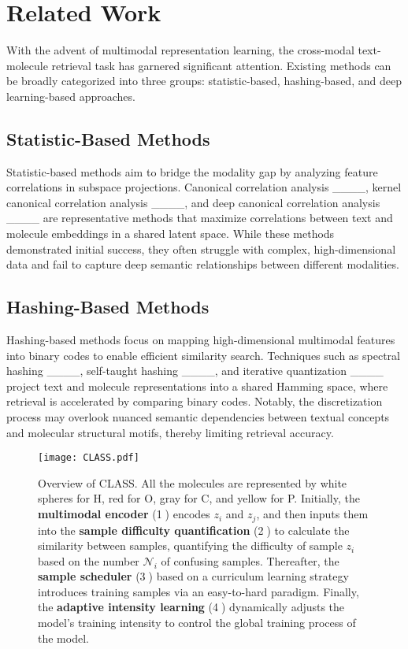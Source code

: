 \section{Related Work}
With the advent of multimodal representation learning, the cross-modal text-molecule retrieval task has garnered significant attention. Existing methods can be broadly categorized into three groups: statistic-based, hashing-based, and deep learning-based approaches.

\subsection{Statistic-Based Methods}
Statistic-based methods aim to bridge the modality gap by analyzing feature correlations in subspace projections. Canonical correlation analysis ____, kernel canonical correlation analysis ____, and deep canonical correlation analysis ____ are representative methods that maximize correlations between text and molecule embeddings in a shared latent space. While these methods demonstrated initial success, they often struggle with complex, high-dimensional data and fail to capture deep semantic relationships between different modalities.

\subsection{Hashing-Based Methods}
Hashing-based methods focus on mapping high-dimensional multimodal features into binary codes to enable efficient similarity search. Techniques such as spectral hashing ____, self-taught hashing ____, and iterative quantization ____ project text and molecule representations into a shared Hamming space, where retrieval is accelerated by comparing binary codes. Notably, the discretization process may overlook nuanced semantic dependencies between textual concepts and molecular structural motifs, thereby limiting retrieval accuracy.

\begin{figure*}[!htbp]
\centering
\texttt{[image: CLASS.pdf]}
\caption{Overview of CLASS. All the molecules are represented by white spheres for H, red for O, gray for C, and yellow for P. Initially, the \textbf{multimodal encoder} (\textcircled{1}) encodes $z_i$ and $z_j$, and then inputs them into the \textbf{sample difficulty quantification} (\textcircled{2}) to calculate the similarity between samples, quantifying the difficulty of sample $z_i$ based on the number $\mathcal{N}_{i}$ of confusing samples. Thereafter, the \textbf{sample scheduler} (\textcircled{3}) based on a curriculum learning strategy introduces training samples via an easy-to-hard paradigm. Finally, the \textbf{adaptive intensity learning} (\textcircled{4}) dynamically adjusts the model's training intensity to control the global training process of the model.}
\vspace{-5pt}
\label{fig:overview}
\end{figure*}

